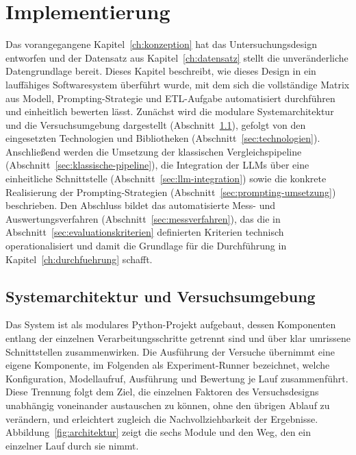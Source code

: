 
\chapter{Implementierung}
\label{ch:implementierung}

Das vorangegangene Kapitel~\ref{ch:konzeption} hat das Untersuchungsdesign entworfen und der Datensatz aus Kapitel~\ref{ch:datensatz} stellt die unveränderliche Datengrundlage bereit. Dieses Kapitel beschreibt, wie dieses Design in ein lauffähiges Softwaresystem überführt wurde, mit dem sich die vollständige Matrix aus Modell, Prompting-Strategie und \ac{ETL}-Aufgabe automatisiert durchführen und einheitlich bewerten lässt. Zunächst wird die modulare Systemarchitektur und die Versuchsumgebung dargestellt (Abschnitt~\ref{sec:architektur}), gefolgt von den eingesetzten Technologien und Bibliotheken (Abschnitt~\ref{sec:technologien}). Anschließend werden die Umsetzung der klassischen Vergleichspipeline (Abschnitt~\ref{sec:klassische-pipeline}), die Integration der \acp{LLM} über eine einheitliche Schnittstelle (Abschnitt~\ref{sec:llm-integration}) sowie die konkrete Realisierung der Prompting-Strategien (Abschnitt~\ref{sec:prompting-umsetzung}) beschrieben. Den Abschluss bildet das automatisierte Mess- und Auswertungsverfahren (Abschnitt~\ref{sec:messverfahren}), das die in Abschnitt~\ref{sec:evaluationskriterien} definierten Kriterien technisch operationalisiert und damit die Grundlage für die Durchführung in Kapitel~\ref{ch:durchfuehrung} schafft.

\section{Systemarchitektur und Versuchsumgebung}
\label{sec:architektur}

Das System ist als modulares Python-Projekt aufgebaut, dessen Komponenten entlang der einzelnen Verarbeitungsschritte getrennt sind und über klar umrissene Schnittstellen zusammenwirken. Die Ausführung der Versuche übernimmt eine eigene Komponente, im Folgenden als Experiment-Runner bezeichnet, welche Konfiguration, Modellaufruf, Ausführung und Bewertung je Lauf zusammenführt. Diese Trennung folgt dem Ziel, die einzelnen Faktoren des Versuchsdesigns unabhängig voneinander austauschen zu können, ohne den übrigen Ablauf zu verändern, und erleichtert zugleich die Nachvollziehbarkeit der Ergebnisse. Abbildung~\ref{fig:architektur} zeigt die sechs Module und den Weg, den ein einzelner Lauf durch sie nimmt.

